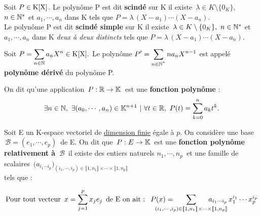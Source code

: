 \vspace{1.2cm}

Soit \(P\in \text{K}[\text{X}] \). Le polynôme P est dit \textbf{scindé} sur K \ssi il existe \(\, \lambda\in K\setminus \{0_K\},\)\\
\(n\in \mathbb{N}^*\) et \(a_1,\cdots,a_n\) dans K tels que \(P=\lambda\,(X-a_1)\cdots(X-a_n).\)\vspace{0.1cm}\\
Le polynôme P est dit \textbf{scindé simple} sur K \ssi il existe \(\, \lambda\in K\setminus \{0_K\},\ n\in \mathbb{N}^*\) et \(a_1,\cdots,a_n\) dans K \emph{deux à deux distincts} tels que \(P=\lambda\,(X-a_1)\cdots(X-a_n).\)

\vspace{1.4cm}

\noindent Soit \(\displaystyle P=\sum_{n\in \mathbb{N}}a_nX^n\in \text{K}[\text{X}]. \) Le polynôme \(\displaystyle P'=\sum_{n\in \mathbb{N}^{^*}}na_nX^{n-1} \) est appelé \textbf{polynôme dérivé} du polynôme P.

\vspace{1.3cm}

On dit qu'une application \(\,P : \mathbb{R} \to \mathbb{K}\,\) est une \textbf{fonction polynôme} \ssi :\vspace{-0.3cm} 
\[\exists n\in \NN,\ \exists (a_0,\cdots,a_n)\in \KK^{n+1} \ | \ \forall t\in \RR,\ P(t)=\sum_{k=0}^{n}a_kt^k. \]

\vspace{1.5cm}

\noindent Soit E un K-espace vectoriel de \underline{dimension finie} égale à $p$. On considère une base \(\,\mathcal{B}=(e_1,\cdots,e_p)\,\) de E. On dit que \(\,P:E\to \mathbb{K}\,\) est une \textbf{fonction polynôme relativement à $\,\mathcal{B}\,$} \ssi il existe des entiers naturels \(n_1,\cdots,n_p\,\) et une famille de scalaires \(\,\displaystyle\bigl(a_{i_1\cdots i_p}\bigr)_{(i_1,\cdots,i_p)\in \llbracket 1,n_1 \rrbracket \times \cdots \times \llbracket 1,n_p \rrbracket}\)\\
tels que :

\[\text{Pour tout vecteur } \,x=\sum_{j=1}^{p}x_je_j\,\text{ de E on ait : }\ P(x)=\hspace{-1cm}\sum_{(i_1,\cdots,i_p)\in \llbracket 1,n_1 \rrbracket \times \cdots \times \llbracket 1,n_p \rrbracket}\hspace{-1cm}a_{i_1\cdots i_p}\,x_1^{i_1}\cdots x_p^{i_p}\]

